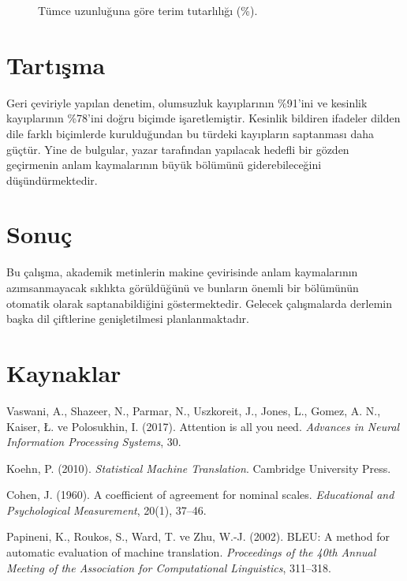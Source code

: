 \documentclass[10pt,a4paper,twocolumn]{article}
\begin{document}
\begin{figure}[h]
\centering
{}
\caption{Tümce uzunluğuna göre terim tutarlılığı (\%).}
\end{figure}

\section{Tartışma}
Geri çeviriyle yapılan denetim, olumsuzluk kayıplarının \%91'ini ve kesinlik kayıplarının
\%78'ini doğru biçimde işaretlemiştir. Kesinlik bildiren ifadeler dilden dile farklı biçimlerde
kurulduğundan bu türdeki kayıpların saptanması daha güçtür. Yine de bulgular, yazar tarafından
yapılacak hedefli bir gözden geçirmenin anlam kaymalarının büyük bölümünü giderebileceğini
düşündürmektedir.

\section{Sonuç}
Bu çalışma, akademik metinlerin makine çevirisinde anlam kaymalarının azımsanmayacak sıklıkta
görüldüğünü ve bunların önemli bir bölümünün otomatik olarak saptanabildiğini göstermektedir.
Gelecek çalışmalarda derlemin başka dil çiftlerine genişletilmesi planlanmaktadır.

\section*{Kaynaklar}
{\small
\noindent[1] Vaswani, A., Shazeer, N., Parmar, N., Uszkoreit, J., Jones, L., Gomez, A. N.,
Kaiser, Ł. ve Polosukhin, I. (2017). Attention is all you need. \textit{Advances in Neural
Information Processing Systems}, 30.

\noindent[2] Koehn, P. (2010). \textit{Statistical Machine Translation}. Cambridge University
Press.

\noindent[3] Cohen, J. (1960). A coefficient of agreement for nominal scales. \textit{Educational
and Psychological Measurement}, 20(1), 37–46.

\noindent[4] Papineni, K., Roukos, S., Ward, T. ve Zhu, W.-J. (2002). BLEU: A method for automatic
evaluation of machine translation. \textit{Proceedings of the 40th Annual Meeting of the
Association for Computational Linguistics}, 311–318.
\par}
\end{document}
